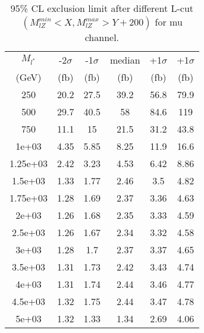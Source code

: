 \documentclass[]{article}
\begin{document}
\begin{table}
\begin{center}
\begin{tabular}{cccccc}
\hline 
\hline 
$M_{l^*}$ & -2$\sigma$ & -1$\sigma$ & median & +1$\sigma$ & +1$\sigma$\\ 
(GeV) & (fb) & (fb) & (fb) & (fb) & (fb)  \\ 
\hline 
\hline 
250 & 20.2 & 27.5 & 39.2 & 56.8 & 79.9\\
500 & 29.7 & 40.5 & 58 & 84.6 & 119\\
750 & 11.1 & 15 & 21.5 & 31.2 & 43.8\\
1e+03 & 4.35 & 5.85 & 8.25 & 11.9 & 16.6\\
1.25e+03 & 2.42 & 3.23 & 4.53 & 6.42 & 8.86\\
1.5e+03 & 1.33 & 1.77 & 2.46 & 3.5 & 4.82\\
1.75e+03 & 1.28 & 1.69 & 2.37 & 3.36 & 4.63\\
2e+03 & 1.26 & 1.68 & 2.35 & 3.33 & 4.59\\
2.5e+03 & 1.26 & 1.67 & 2.34 & 3.32 & 4.58\\
3e+03 & 1.28 & 1.7 & 2.37 & 3.37 & 4.65\\
3.5e+03 & 1.31 & 1.73 & 2.42 & 3.43 & 4.74\\
4e+03 & 1.31 & 1.74 & 2.44 & 3.46 & 4.77\\
4.5e+03 & 1.32 & 1.75 & 2.44 & 3.47 & 4.78\\
5e+03 & 1.32 & 1.33 & 1.34 & 2.69 & 4.06\\
\hline 
\end{tabular}
\caption{95\% CL exclusion limit after different L-cut $(M_{lZ}^{min} < X, M_{lZ}^{max} > Y + 200)$ for mu channel.}
\label{tab:limit_muon}
\end{center}
\end{table}
\end{document}
